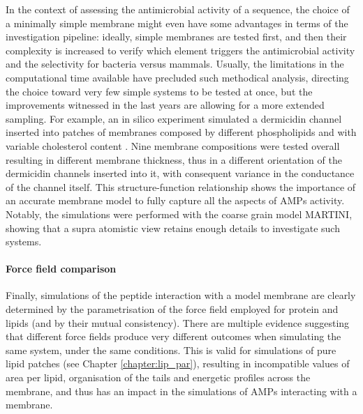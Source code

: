 In the context of assessing the antimicrobial activity of a sequence, the choice of a minimally simple membrane might even have some advantages in terms of the investigation pipeline: ideally, simple membranes are tested first, and then their complexity is increased to verify which element triggers the antimicrobial activity and the selectivity for bacteria versus mammals. Usually, the limitations in the computational time available have precluded such methodical analysis, directing the choice toward very few simple systems to be tested at once, but the improvements witnessed in the last years are allowing for a more extended sampling.
%
For example, an in silico experiment simulated a dermicidin channel inserted into patches of membranes composed by different phospholipids and with variable cholesterol content \cite{Song2019}. Nine membrane compositions were tested overall resulting in different membrane thickness, thus in a different orientation of the dermicidin channels inserted into it, with consequent variance in the conductance of the channel itself. This structure-function relationship shows the importance of an accurate membrane model to fully capture all the aspects of AMPs activity. Notably, the simulations were performed with the coarse grain model MARTINI, showing that a supra atomistic view retains enough details to investigate such systems.


\paragraph{Force field comparison} Finally, simulations of the peptide interaction with a model membrane are clearly determined by the parametrisation of the force field employed for protein and lipids (and by their mutual consistency).
%
There are multiple evidence suggesting that different force fields produce very different outcomes when simulating the same system, under the same conditions. This is valid for simulations of pure lipid patches (see Chapter \ref{chapter:lip_par}), resulting in incompatible values of area per lipid, organisation of the tails and energetic profiles across the membrane, and thus has an impact in the simulations of AMPs interacting with a membrane.

